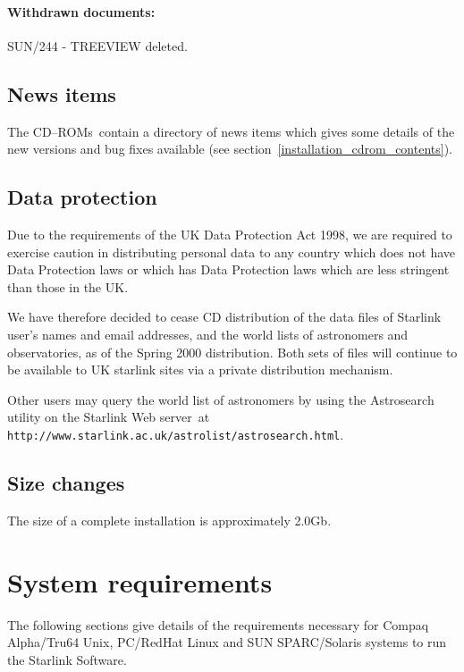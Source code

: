 \documentclass[twoside,11pt]{article}
\newcommand{\htmladdnormallink}[2]{#1}
\newcommand{\latex}[1]{#1}
\newcommand{\xlabel}[1]{}
\renewcommand{\_}{\texttt{\symbol{95}}}
\newcommand{\cdroms}{CD--ROMs}
\newcommand{\cdroms}{CD-ROMs}
\begin{document}
\paragraph{Withdrawn documents:}

SUN/244 - TREEVIEW deleted.

\subsection{News items}

The \cdroms\ contain a directory of news items which gives some
details of the new versions and bug fixes available (see
section~\ref{installation_cdrom_contents}).

\subsection{\xlabel{data_protection}Data protection}
\label{data_protection}

Due to the requirements of the UK Data Protection Act 1998, we are
required to exercise caution in distributing personal data to any country
which does not have Data Protection laws or which has Data Protection
laws which are less stringent than those in the UK.

We have therefore decided to cease CD distribution of the data files
of Starlink user's names and email addresses, and the world lists of
astronomers and observatories, as of the Spring 2000 distribution.
Both sets of files will continue to be available to UK starlink sites
via a private distribution mechanism.

Other users may query the world list of astronomers by using the
\htmladdnormallink{Astrosearch}{http://www.starlink.ac.uk/astrolist/astrosearch.html}
utility on the Starlink Web server\latex{~at
\texttt{http://www.starlink.ac.uk/astrolist/astrosearch.html}}.

\subsection{Size changes}

The size of a complete installation is approximately 2.0Gb.

\newpage
\section{\xlabel{system_requirements}System requirements}
\label{system_requirements}

The following sections give details of the requirements necessary for
Compaq Alpha/Tru64 Unix, PC/RedHat Linux and SUN SPARC/Solaris
systems to run the Starlink Software.
\end{document}
